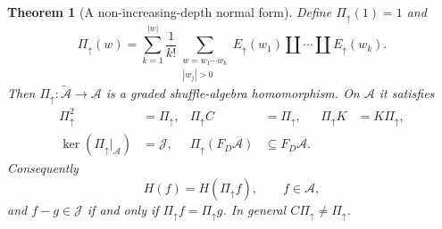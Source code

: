 \documentclass[11pt,a4paper]{article}
\numberwithin{equation}{section}
\newtheorem{theorem}{Theorem}[section]
\theoremstyle{definition}
\theoremstyle{remark}
\newcommand{\shuffle}{\mathbin{\amalg}}
\begin{document}
\begin{theorem}[A non-increasing-depth normal form]\label{depthcay:thm:projector}
Define $\Pi_{\uparrow}(1)=1$ and
\begin{equation}\label{depthcay:eq:projector}
 \boxed{\displaystyle
 \Pi_{\uparrow}(w)=\sum_{k=1}^{|w|}\frac1{k!}
 \sum_{\substack{w=w_1\cdots w_k\\|w_j|>0}}
 E_{\uparrow}(w_1)\shuffle\cdots\shuffle E_{\uparrow}(w_k).}
\end{equation}
Then $\Pi_{\uparrow}:\widetilde{\mathcal A}\to\mathcal A$ is a graded
shuffle-algebra homomorphism. On $\mathcal A$ it satisfies
\begin{align}
 \Pi_{\uparrow}^2&=\Pi_{\uparrow},&
 \Pi_{\uparrow}C&=\Pi_{\uparrow},&
 \Pi_{\uparrow}K&=K\Pi_{\uparrow},\label{depthcay:eq:properties}\\
 \ker(\Pi_{\uparrow}|_{\mathcal A})&=\mathcal J,&
 \Pi_{\uparrow}(F_D\mathcal A)&\subseteq F_D\mathcal A.
 \label{depthcay:eq:kernel-depth}
\end{align}
Consequently
\begin{equation}\label{depthcay:eq:period-normalform}
 H(f)=H(\Pi_{\uparrow}f),\qquad f\in\mathcal A,
\end{equation}
and $f-g\in\mathcal J$ if and only if
$\Pi_{\uparrow}f=\Pi_{\uparrow}g$.
In general $C\Pi_{\uparrow}\ne\Pi_{\uparrow}$.
\end{theorem}
\end{document}
